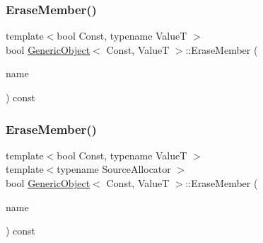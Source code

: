 \mbox{\label{classGenericObject_af0d31a8547051624449494a339b20107}} 
\subsubsection{\texorpdfstring{Erase\+Member()}{EraseMember()}\hspace{0.1cm}{\footnotesize\ttfamily [3/4]}}
{\footnotesize\ttfamily template$<$bool Const, typename ValueT $>$ \\
bool \hyperlink{classGenericObject}{Generic\+Object}$<$ Const, ValueT $>$\+::Erase\+Member (\begin{DoxyParamCaption}\item[{\hyperlink{classGenericObject_af70c9646b5e422306c33e98b3d8783a7}{const} \hyperlink{classGenericObject_ac6747e5baa13e15bcea1658b5624647a}{Ch} $\ast$}]{name }\end{DoxyParamCaption}) const\hspace{0.3cm}{\ttfamily [inline]}}

\mbox{\label{classGenericObject_a4cd6f90444f20cc9d5577747d3968da4}} 
\subsubsection{\texorpdfstring{Erase\+Member()}{EraseMember()}\hspace{0.1cm}{\footnotesize\ttfamily [4/4]}}
{\footnotesize\ttfamily template$<$bool Const, typename ValueT $>$ \\
template$<$typename Source\+Allocator $>$ \\
bool \hyperlink{classGenericObject}{Generic\+Object}$<$ Const, ValueT $>$\+::Erase\+Member (\begin{DoxyParamCaption}\item[{\hyperlink{classGenericObject_af70c9646b5e422306c33e98b3d8783a7}{const} \hyperlink{classGenericValue}{Generic\+Value}$<$ \hyperlink{classGenericObject_a96ebfdde095e2ce42535d15ae5dc58ef}{Encoding\+Type}, Source\+Allocator $>$ \&}]{name }\end{DoxyParamCaption}) const\hspace{0.3cm}{\ttfamily [inline]}}

